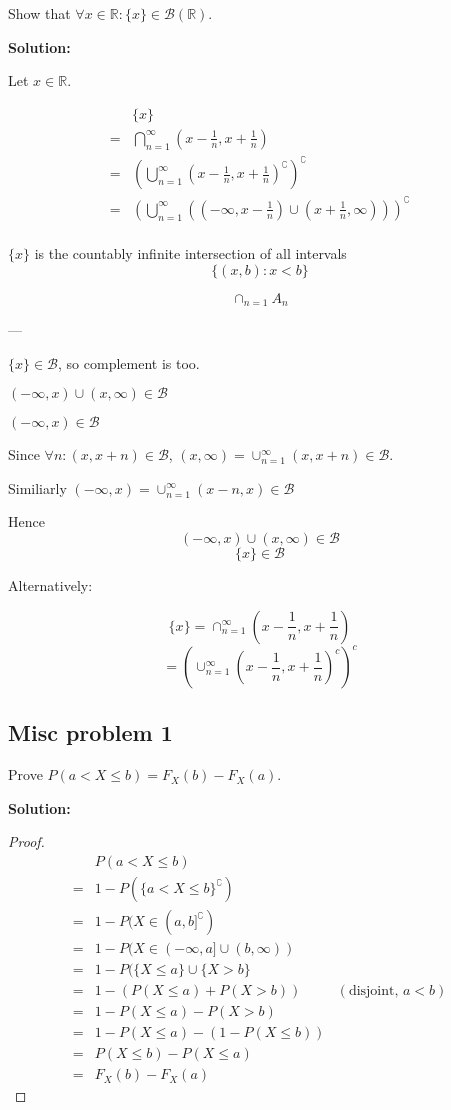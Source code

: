 \documentclass{article}
\begin{document}
Show that \(\forall x \in \mathbb{R}:\{x\}\in \mathcal{B}(\mathbb{R})\).

\textbf{Solution:}

Let \(x\in \mathbb{R}\).

\begin{align*}
     & \{x\} \\
    =& \bigcap_{n=1}^\infty (x-\frac{1}{n}, x+\frac{1}{n}) \\
    =& \left(\bigcup_{n=1}^\infty (x-\frac{1}{n}, x+\frac{1}{n})^\complement\right)^\complement \\
    =& \left(\bigcup_{n=1}^\infty\left( (-\infty,x-\frac{1}{n})\cup (x+\frac{1}{n}      ,\infty) \right)\right)^\complement \\
\end{align*}

\(\{x\}\) is the countably infinite intersection of all intervals
\[\{(x,b):x<b\}\]

\[\cap_{n=1} A_n \]

---

\(\{x\} \in \mathcal{B}\), so complement is too.

\((-\infty,x)\cup (x,\infty)\in \mathcal{B}\)

\((-\infty,x)\in \mathcal{B}\)

Since \(\forall n: (x,x+n)\in \mathcal{B}\),
\((x,\infty)=\cup_{n=1}^\infty(x,x+n)\in \mathcal{B}\).

Similiarly
\((-\infty,x)=\cup_{n=1}^\infty (x-n,x)\in\mathcal{B}\)

Hence
\[(-\infty,x)\cup (x,\infty)\in \mathcal{B}\]
\[\{x\}\in \mathcal{B}\]

Alternatively:

\[\{x\} = \cap_{n=1}^{\infty} (x-\frac{1}{n}, x+\frac{1}{n})\]
\[= (\cup_{n=1}^{\infty} (x-\frac{1}{n}, x+\frac{1}{n})^c)^c\]

\subsection{Misc problem 1}

Prove \(P(a < X \leq b) = F_X(b)-F_X(a)\).

\textbf{Solution:}

\begin{proof}
\begin{align*}
     & P(a<X\leq b) \\
    =& 1-P(\{a<X\leq b\}^\complement) \\
    =& 1-P(X\in (a,b]^\complement) \\
    =& 1-P(X\in (-\infty,a] \cup (b,\infty)) \\
    =& 1-P(\{X\leq a\} \cup \{X>b\} \\
    =& 1-(P(X\leq a)+P(X>b)) & (\text{disjoint, }a<b) \\
    =& 1-P(X\leq a)-P(X>b) \\
    =& 1-P(X\leq a)-(1-P(X\leq b)) \\
    =& P(X\leq b)-P(X\leq a) \\
    =& F_X(b)-F_X(a)
\end{align*}
\end{proof}
\end{document}
